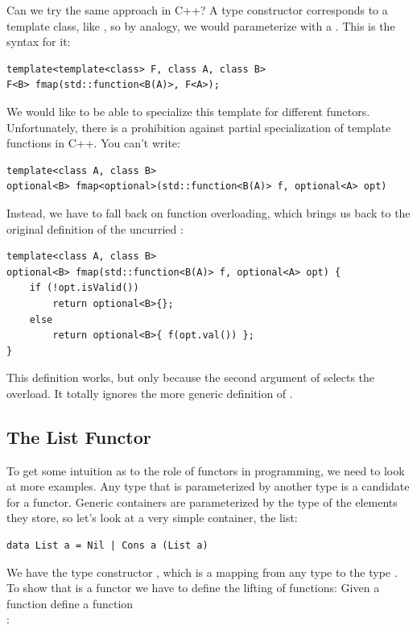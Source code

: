 Can we try the same approach in C++? A type constructor corresponds to a
template class, like , so by analogy, we would
parameterize  with a 
. This is the syntax for it:

\begin{Verbatim}
template<template<class> F, class A, class B>
F<B> fmap(std::function<B(A)>, F<A>);
\end{Verbatim}
We would like to be able to specialize this template for different
functors. Unfortunately, there is a prohibition against partial
specialization of template functions in C++. You can't write:

\begin{Verbatim}
template<class A, class B>
optional<B> fmap<optional>(std::function<B(A)> f, optional<A> opt)
\end{Verbatim}
Instead, we have to fall back on function overloading, which brings us
back to the original definition of the uncurried :

\begin{Verbatim}
template<class A, class B>
optional<B> fmap(std::function<B(A)> f, optional<A> opt) { 
    if (!opt.isValid()) 
        return optional<B>{}; 
    else
        return optional<B>{ f(opt.val()) };
}
\end{Verbatim}
This definition works, but only because the second argument of
 selects the overload. It totally ignores the more generic
definition of .

\subsection{The List Functor}

To get some intuition as to the role of functors in programming, we need
to look at more examples. Any type that is parameterized by another type
is a candidate for a functor. Generic containers are parameterized by
the type of the elements they store, so let's look at a very simple
container, the list:

\begin{Verbatim}
data List a = Nil | Cons a (List a)
\end{Verbatim}
We have the type constructor , which is a mapping from any
type  to the type . To show that 
is a functor we have to define the lifting of functions: Given a
function  define a function\\
:

